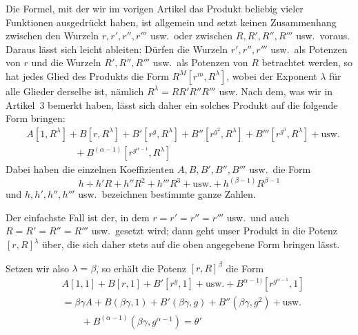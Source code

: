 Die Formel, mit der wir im vorigen Artikel das Produkt beliebig vieler Funktionen ausgedrückt haben, ist allgemein und setzt keinen Zusammenhang zwischen den Wurzeln $r,r',r'',r'''$ usw.\ oder zwischen $R,R',R'',R'''$ usw.\ voraus. Daraus lässt sich leicht ableiten: Dürfen die Wurzeln $r',r'',r'''$ usw.\ als Potenzen von $r$ und die Wurzeln $R',R'',R'''$ usw.\ als Potenzen von $R$ betrachtet werden, so hat jedes Glied des Produkts die Form $R^M[r^m,R^\lambda]$, wobei der Exponent $\lambda$ für alle Glieder derselbe ist, nämlich $R^\lambda=RR'R''R'''$ usw. Nach dem, was wir in Artikel~3 bemerkt haben, lässt sich daher ein solches Produkt auf die folgende Form bringen:
\[
\begin{aligned}
&A[1,R^\lambda]+B[r,R^\lambda]+B'[r^g,R^\lambda]+B''[r^{g^2},R^\lambda]+B'''[r^{g^3},R^\lambda]+\text{usw.}\\
&\hspace{5em}{}+B^{(\alpha-1)}[r^{g^{\alpha-1}},R^\lambda]
\end{aligned}
\]
Dabei haben die einzelnen Koeffizienten $A,B,B',B'',B'''$ usw.\ die Form
\[
h+h'R+h''R^2+h'''R^3+\text{usw.}+h^{(\beta-1)}R^{\beta-1}
\]
und $h,h',h'',h'''$ usw.\ bezeichnen bestimmte ganze Zahlen.

Der einfachste Fall ist der, in dem $r=r'=r''=r'''$ usw.\ und auch $R=R'=R''=R'''$ usw.\ gesetzt wird; dann geht unser Produkt in die Potenz $[r,R]^\lambda$ über, die sich daher stets auf die oben angegebene Form bringen lässt.

Setzen wir also $\lambda=\beta$, so erhält die Potenz $[r,R]^\beta$ die Form
\[
\begin{aligned}
&A[1,1]+B[r,1]+B'[r^g,1]+\text{usw.}+B^{\alpha-1)}[r^{g^{\alpha-1}},1]\\
&{}=\beta\gamma A+B(\beta\gamma,1)+B'(\beta\gamma,g)+B''(\beta\gamma,g^2)+\text{usw.}\\
&\qquad{}+B^{(\alpha-1)}(\beta\gamma,g^{\alpha-1})=\theta'
\end{aligned}
\]

